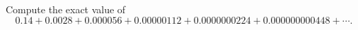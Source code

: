 Compute the exact value of
\[
0.14+0.0028+0.000056+0.00000112+0.0000000224+0.000000000448+\cdots .
\]

